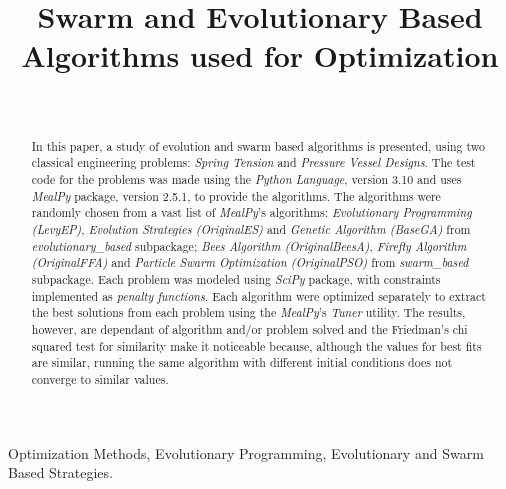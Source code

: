 \documentclass[conference]{IEEEtran}
\begin{document}
\title{Swarm and Evolutionary Based Algorithms used for Optimization}
\author{
	\\
}

\maketitle


\begin{abstract}
    In this paper, a study of evolution and swarm based algorithms is presented,
    using two classical engineering problems: \textit{Spring Tension} and \textit{Pressure Vessel
    Designs}. The test code for the problems was made using the \textit{Python Language},
    version 3.10 and uses \textit{MealPy} package, version 2.5.1,  to provide the algorithms.
    The algorithms were randomly chosen from a vast list of \textit{MealPy}'s algorithms:
    \textit{Evolutionary Programming (LevyEP)}, \textit{Evolution Strategies (OriginalES)} and
    \textit{Genetic Algorithm (BaseGA)} from \textit{evolutionary\_based} subpackage;
    \textit{Bees Algorithm (OriginalBeesA)}, \textit{Firefly Algorithm (OriginalFFA)} and
    \textit{Particle Swarm Optimization (OriginalPSO)} from \textit{swarm\_based} subpackage.
    Each problem was modeled using \textit{SciPy} package, with constraints implemented as
    \textit{penalty functions}. Each algorithm were optimized separately to extract the best
    solutions from each problem using the \textit{MealPy}'s \textit{Tuner} utility.
    The results, however, are dependant of algorithm and/or problem solved and the Friedman's chi
    squared test for similarity make it noticeable because, although the values for best fits are
    similar, running the same algorithm with different initial conditions does not converge to similar
    values.
\end{abstract}

\begin{IEEEkeywords}
	Optimization Methods, Evolutionary Programming, Evolutionary and Swarm Based Strategies.
\end{IEEEkeywords}
\end{document}
